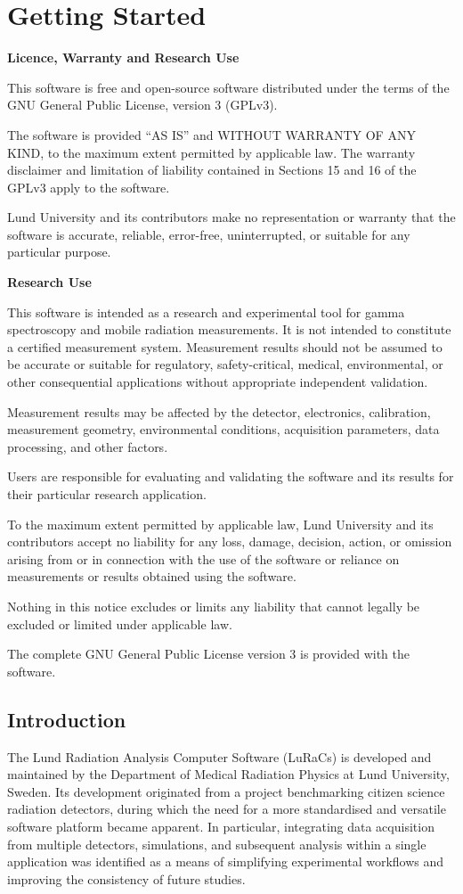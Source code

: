 \section{Getting Started}
\textbf{Licence, Warranty and Research Use}

This software is free and open-source software distributed under the terms of the GNU General Public License, version 3 (GPLv3).

The software is provided “AS IS” and WITHOUT WARRANTY OF ANY KIND, to the maximum extent permitted by applicable law. The warranty disclaimer and limitation of liability contained in Sections 15 and 16 of the GPLv3 apply to the software.

Lund University and its contributors make no representation or warranty that the software is accurate, reliable, error-free, uninterrupted, or suitable for any particular purpose.

\textbf{Research Use}

This software is intended as a research and experimental tool for gamma spectroscopy and mobile radiation measurements. It is not intended to constitute a certified measurement system. Measurement results should not be assumed to be accurate or suitable for regulatory, safety-critical, medical, environmental, or other consequential applications without appropriate independent validation.

Measurement results may be affected by the detector, electronics, calibration, measurement geometry, environmental conditions, acquisition parameters, data processing, and other factors.

Users are responsible for evaluating and validating the software and its results for their particular research application.

To the maximum extent permitted by applicable law, Lund University and its contributors accept no liability for any loss, damage, decision, action, or omission arising from or in connection with the use of the software or reliance on measurements or results obtained using the software.

Nothing in this notice excludes or limits any liability that cannot legally be excluded or limited under applicable law.

The complete GNU General Public License version 3 is provided with the software.

\subsection{Introduction}
The Lund Radiation Analysis Computer Software (LuRaCs) is developed and maintained by the Department of Medical Radiation Physics at Lund University, Sweden. Its development originated from a project benchmarking citizen science radiation detectors, during which the need for a more standardised and versatile software platform became apparent. In particular, integrating data acquisition from multiple detectors, simulations, and subsequent analysis within a single application was identified as a means of simplifying experimental workflows and improving the consistency of future studies.


